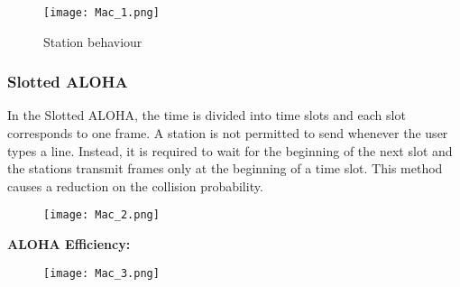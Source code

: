 \documentclass[../resumosRCOM.tex]{subfiles}
\begin{document}
\begin{figure}[H]
    \centering
    \texttt{[image: Mac\_1.png]}
    \caption{Station behaviour}
\end{figure}

\subsubsection{Slotted ALOHA}
In the Slotted ALOHA, the time is divided into time slots and each slot corresponds to one frame.
\newline
A station is not permitted to send whenever the user types a line. Instead, it is required to wait for the beginning of the next slot and the stations transmit frames only at the beginning of a time slot.
\newline
This method causes a reduction on the collision probability.

\begin{figure}[H]
    \centering
    \texttt{[image: Mac\_2.png]}
\end{figure}
\textbf{ALOHA Efficiency:}
\begin{figure}[H]
    \centering
    \texttt{[image: Mac\_3.png]}
\end{figure}
\end{document}
